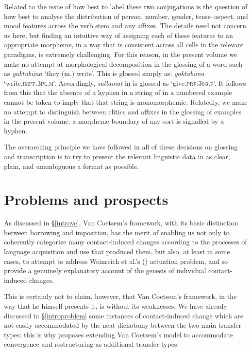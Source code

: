 \documentclass[output=paper]{langsci/langscibook}
\begin{document}
Related to the issue of how best to label these two conjugations is the question of how best to analyse the distribution of person, number, {gender}, tense--aspect, and mood features across the verb {stem} and any affixes. The details need not concern us here, but finding an intuitive way of assigning each of these features to an appropriate morpheme, in a way that is consistent across all cells in the relevant paradigms, is extremely challenging. For this reason, in the present volume we make no attempt at morphological decomposition in the glossing of a word such as  \textit{yaktubūna} `they (m.) write'. This is glossed simply as: \textit{yaktubūna} `write.\textsc{impf.3pl.m}'. Accordingly, \textit{sallamat} in  is glossed as `give.\textsc{prf.3sg.f}'. It follows from this that the absence of a hyphen in a string of  in a numbered example cannot be taken to imply that that string is monomorphemic. Relatedly, we make no attempt to distinguish between clitics and affixes in the glossing of  examples in the present volume: a morpheme boundary of any sort is signalled by a hyphen.


The overarching principle we have followed in all of these decisions on glossing and transcription is to try to present the relevant linguistic data in as clear, plain, and unambiguous a format as possible.

\section{Problems and prospects}\label{introthemes}
As discussed in §\ref{introvc}, Van Coetsem's framework, with its basic distinction between borrowing and imposition, has the merit of enabling us not only to coherently categorize many contact-induced changes according to the processes of language acquisition and use that produced them, but also, at least in some cases, to attempt to address Weinreich et al.'s (\citeyear{WeinreichLabovHerzog1968}) actuation problem, and so provide a genuinely explanatory account of the genesis of individual contact-induced changes. 

This is certainly not to claim, however, that Van Coetsem's framework, in the way that he himself presents it, is without its weaknesses. We have already discussed in §\ref{introproblem} some instances of contact-induced change which are not easily accommodated by the neat dichotomy between the two main transfer types: this is why \citet{Lucas2015} proposes extending Van Coetsem's model to accommodate convergence and restructuring as additional transfer types.
\end{document}
